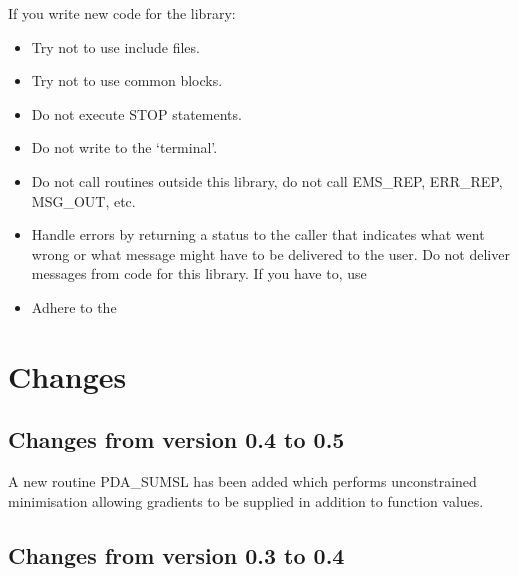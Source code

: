 \documentclass[11pt,twoside,nolof]{starlink}
\begin{document}
   If you write new code for the library:
\begin{itemize}
\item Try not to use include files.
\item Try not to use common blocks.
\item Do not execute STOP statements.
\item Do not write to the `terminal'.
\item Do not call routines outside this library, do not call EMS\_REP,
   ERR\_REP, MSG\_OUT, etc.
\item Handle errors by returning a status to the caller that indicates
   what went wrong or what message might have to be delivered to the
   user. Do not deliver messages from code for this library. If you have
   to, use
\item Adhere to the
\end{itemize}

\section{Changes}

\subsection{Changes from version 0.4 to 0.5}
A new routine PDA\_SUMSL has been added which performs unconstrained
minimisation allowing gradients to be supplied in addition to function
values.

\subsection{Changes from version 0.3 to 0.4}
\end{document}
